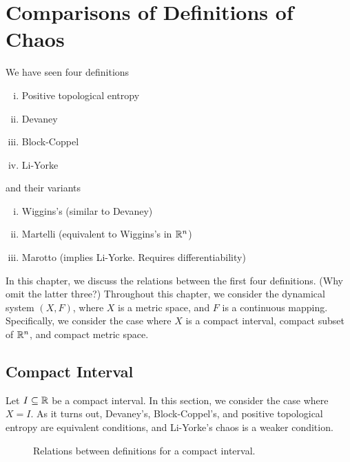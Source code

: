 \documentclass[12pt,twoside,draft]{book}
\begin{document}
\chapter{Comparisons of Definitions of Chaos}
We have seen four definitions 
\begin{enumerate}[(i)]
  \item Positive topological entropy
  \item Devaney
  \item Block-Coppel
  \item Li-Yorke
\end{enumerate}
and their variants
\begin{enumerate}[(i)]
  \item Wiggins's (similar to Devaney)
  \item Martelli (equivalent to Wiggins's in $\mathbb{R}^n$)
  \item Marotto (implies Li-Yorke. Requires differentiability)
\end{enumerate}
In this chapter, we discuss the relations between the first four definitions.
(Why omit the latter three?)
Throughout this chapter, we consider the dynamical system $(X,F)$, where $X$ is a metric space, and $F$ is a continuous mapping.
Specifically, we consider the case where $X$ is a compact interval, compact subset of $\mathbb{R}^n$, and compact metric space.


\section{Compact Interval}
Let $I \subseteq \mathbb{R}$ be a compact interval.
In this section, we consider the case where $X = I$.
As it turns out, Devaney's, Block-Coppel's, and positive topological entropy are equivalent conditions, and Li-Yorke's chaos is a weaker condition.
\begin{figure}[ht]
\caption{Relations between definitions for a compact interval.}
\end{figure}
\end{document}

